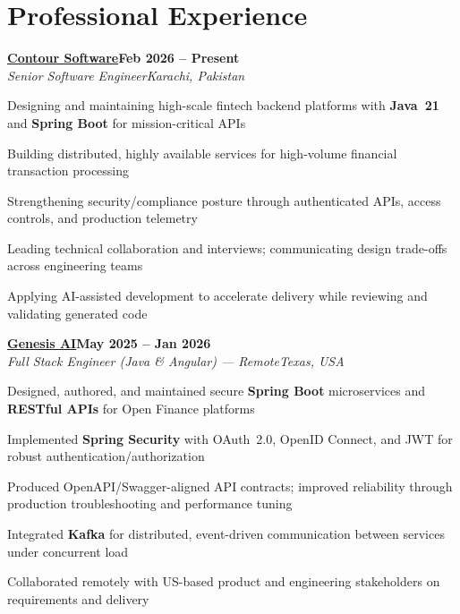 \documentclass[letterpaper,10pt]{article}
\newcommand{\heading}[2]{
  \hspace{8pt}#1\hfill#2\\
}
\newcommand{\headingBf}[2]{
  \heading{\textbf{#1}}{\textbf{#2}}
}
\newcommand{\headingIt}[2]{
  \heading{\textit{#1}}{\textit{#2}}
}
\newenvironment{resume_list}{
  \vspace{-6pt}
  \begin{itemize}[itemsep=-1px, parsep=0.5pt, topsep=1pt, leftmargin=22pt]
}{
  \end{itemize}
  \vspace{-2pt}
}
\begin{document}
\section{Professional Experience}

\headingBf{\href{https://contour-software.com/}{Contour Software}}{Feb 2026 -- Present}
\headingIt{Senior Software Engineer}{Karachi, Pakistan}
\begin{resume_list}
  \item Designing and maintaining high-scale fintech backend platforms with \textbf{Java~21} and \textbf{Spring Boot} for mission-critical APIs
  \item Building distributed, highly available services for high-volume financial transaction processing
  \item Strengthening security/compliance posture through authenticated APIs, access controls, and production telemetry
  \item Leading technical collaboration and interviews; communicating design trade-offs across engineering teams
  \item Applying AI-assisted development to accelerate delivery while reviewing and validating generated code
\end{resume_list}

\vspace{2pt}
\headingBf{\href{https://www.linkedin.com/company/genesisaico/}{Genesis AI}}{May 2025 -- Jan 2026}
\headingIt{Full Stack Engineer (Java \& Angular) --- Remote}{Texas, USA}
\begin{resume_list}
  \item Designed, authored, and maintained secure \textbf{Spring Boot} microservices and \textbf{RESTful APIs} for Open Finance platforms
  \item Implemented \textbf{Spring Security} with OAuth~2.0, OpenID Connect, and JWT for robust authentication/authorization
  \item Produced OpenAPI/Swagger-aligned API contracts; improved reliability through production troubleshooting and performance tuning
  \item Integrated \textbf{Kafka} for distributed, event-driven communication between services under concurrent load
  \item Collaborated remotely with US-based product and engineering stakeholders on requirements and delivery
\end{resume_list}
\end{document}

